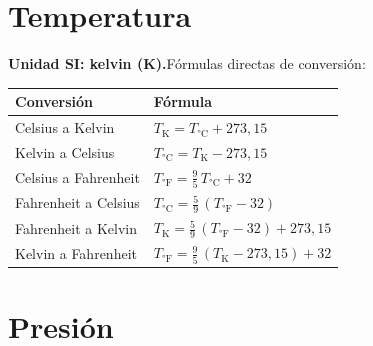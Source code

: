 \documentclass[12pt, letterpaper]{article}
\begin{document}
\section{Temperatura}

\begin{cuadroteoria}
    \textbf{Unidad SI: kelvin (K).}\quad Fórmulas directas de conversión:
    \begin{center}
        \begin{tabular}{ll}
            \toprule
            \textbf{Conversión}  & \textbf{Fórmula}                                              \\
            \midrule
            Celsius a Kelvin     & $T_{\text{K}} = T_{°\text{C}} + 273{,}15$                     \\[4pt]
            Kelvin a Celsius     & $T_{°\text{C}} = T_{\text{K}} - 273{,}15$                     \\[4pt]
            Celsius a Fahrenheit & $T_{°\text{F}} = \frac{9}{5}\,T_{°\text{C}} + 32$             \\[4pt]
            Fahrenheit a Celsius & $T_{°\text{C}} = \frac{5}{9}\,(T_{°\text{F}} - 32)$           \\[4pt]
            Fahrenheit a Kelvin  & $T_{\text{K}} = \frac{5}{9}\,(T_{°\text{F}} - 32) + 273{,}15$ \\[4pt]
            Kelvin a Fahrenheit  & $T_{°\text{F}} = \frac{9}{5}\,(T_{\text{K}} - 273{,}15) + 32$ \\
            \bottomrule
        \end{tabular}
    \end{center}
\end{cuadroteoria}

\section{Presión}
\end{document}
